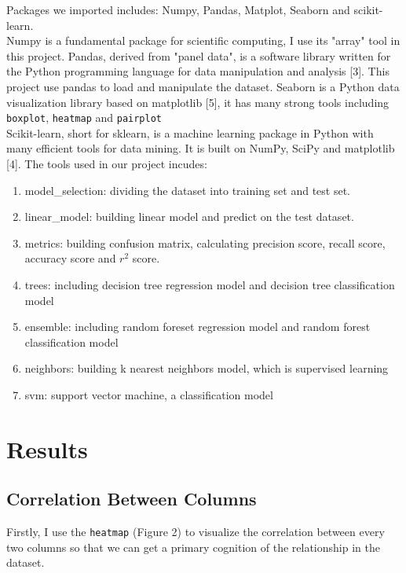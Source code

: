 \documentclass[12pt]{article}
\begin{document}
\begin{sloppypar}
Packages we imported includes: Numpy, Pandas, Matplot, Seaborn and scikit-learn.\\
Numpy is a fundamental package for scientific computing, I use its "array" tool in this project. Pandas, derived from "panel data", is a software library written for the Python programming language for data manipulation and analysis [3]. This project use pandas to load and manipulate the dataset. Seaborn is a Python data visualization library based on matplotlib [5], it has many strong tools including \texttt{boxplot}, \texttt{heatmap} and \texttt{pairplot}\\
Scikit-learn, short for sklearn, is a machine learning package in Python with many efficient tools for data mining. It is built on NumPy, SciPy and matplotlib [4]. The tools used in our project incudes: 
\begin{enumerate}
    \item model\_selection: dividing the dataset into training set and test set.
    \item linear\_model: building linear model and predict on the test dataset.
    \item metrics: building confusion matrix, calculating precision score, recall score, accuracy score and $r^2$ score. 
    \item trees: including decision tree regression model and decision tree classification model
    \item ensemble: including random foreset regression model and random forest classification model
    \item neighbors: building k nearest neighbors model, which is supervised learning
    \item svm: support vector machine, a classification model
\end{enumerate}

\section{Results}

\subsection{Correlation Between Columns}

Firstly, I use the \texttt{heatmap} (Figure 2) to visualize the correlation between every two columns so that we can get a primary cognition of the relationship in the dataset.


\end{sloppypar}
\end{document}
